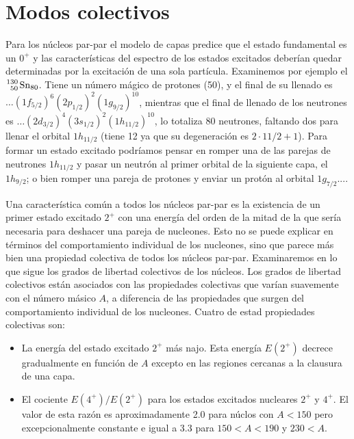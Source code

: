 \section{Modos colectivos}

Para los núcleos par-par el modelo de capas predice que el estado fundamental es un $0^+$ y las características del espectro de los estados excitados deberían quedar determinadas por la excitación de una sola partícula. Examinemos por ejemplo el $\ce{^130_50 Sn_80}$. Tiene un número mágico de protones (50), y el final de su llenado es $\ldots(1f_{5/2})^6 (2p_{1/2})^2 (1g_{9/2})^{10}$, mientras que el final de llenado de los neutrones es $\ldots(2d_{3/2})^4(3s_{1/2})^2(1h_{11/2})^10$, lo totaliza 80 neutrones, faltando dos para llenar el orbital $1h_{11/2}$ (tiene 12 ya que su degeneración es $2\cdot 11/2+1$). Para formar un estado excitado podríamos pensar en romper una de las parejas de neutrones $1h_{11/2}$ y pasar un neutrón al primer orbital de la siguiente capa, el $1h_{9/2}$; o bien romper una pareja de protones y enviar un protón al orbital $1g_{7/2}$.... 

\Revisar
 
Una característica común a todos los núcleos par-par es la existencia de un primer estado excitado $2^+$ con una energía del orden de la mitad de la que sería necesaria para deshacer una pareja de nucleones. Esto no se puede explicar en términos del comportamiento individual de los nucleones, sino que parece más bien una propiedad colectiva de todos los núcleos par-par. Examinaremos en lo que sigue los grados de libertad colectivos de los núcleos. Los grados de libertad colectivos están asociados con las propiedades colectivas que varían suavemente con el número másico $A$, a diferencia de las propiedades que surgen del comportamiento individual de los nucleones. Cuatro de estad propiedades colectivas son:

\begin{itemize}
	\item La energía del estado excitado $2^+$ más najo. Esta energía $E(2^+)$ decrece gradualmente en función de $A$ excepto en las regiones cercanas a la clausura de una capa.
	\item El cociente $E(4^+)/E(2^+)$ para los estados excitados nucleares $2^+$ y $4^+$. El valor de esta razón es aproximadamente 2.0 para núclos con $A<150$ pero excepcionalmente constante e igual a 3.3 para $150<A<190$ y $230<A$. 
\end{itemize}
